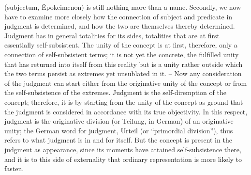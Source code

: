 (subjectum, Ëpokeimenon) is still nothing more than a name.
Secondly, we now have to examine more closely how the connection of
subject and predicate in judgment is determined, and how the two are
themselves thereby determined. Judgment has in general totalities for its
sides, totalities that are at first essentially self-subsistent. The unity of the
concept is at first, therefore, only a connection of self-subsistent terms; it is
not yet the concrete, the fulfilled unity that has returned into itself from this
reality but is a unity rather outside which the two terms persist as extremes
yet unsublated in it. – Now any consideration of the judgment can start
either from the originative unity of the concept or from the self-subsistence
of the extremes. Judgment is the self-diremption of the concept; therefore,
it is by starting from the unity of the concept as ground that the judgment is
considered in accordance with its true objectivity. In this respect, judgment
is the originative division (or Teilung, in German) of an originative unity; the
German word for judgment, Urteil (or “primordial division”), thus refers
to what judgment is in and for itself. But the concept is present in the
judgment as appearance, since its moments have attained self-subsistence
there, and it is to this side of externality that ordinary representation is more
likely to fasten.

